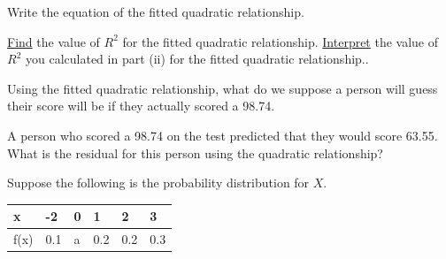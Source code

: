 \documentclass[addpoints]{examsetup}
\begin{document}
\begin{questions}
\begin{parts}
   \begin{subparts}
      \subpart[5] Write the equation of the fitted quadratic relationship.

\hfill {}


\newpage  


      \vspace{1cm}
      \subpart[3] \underline{Find}  the value of $R^2$ for the fitted quadratic relationship.
                        \hfill {}
      \vspace{7cm}                  
      \subpart[3] \underline{Interpret} the value of $R^2$ you calculated in part (ii)  for the fitted quadratic relationship..
                                         

      \vspace{4cm}
      \subpart[5] Using the fitted quadratic relationship, what do we suppose a person will guess their score will be if they actually scored a 98.74.
      
                  \hfill {}

      \vspace{2cm}
     
      \subpart[2] A person who scored a 98.74 on the test predicted that they would score 63.55. What is the residual for this person using the quadratic relationship?
      
\hfill {}

      \vspace{2cm}
   \end{subparts}
\end{parts}

\pagebreak

\question
Suppose the following is the probability distribution for $X$. 
 \begin{table}[h!]
     \centering
     \begin{tabular}{llllll}
        \hline
         x  & -2  & 0 &  1  & 2 & 3     \\\hline \hline
         f(x) & 0.1 &  a & 0.2  & 0.2 &  0.3  \\\hline \hline


\end{tabular}
\end{table}
\end{questions}
\end{document}
